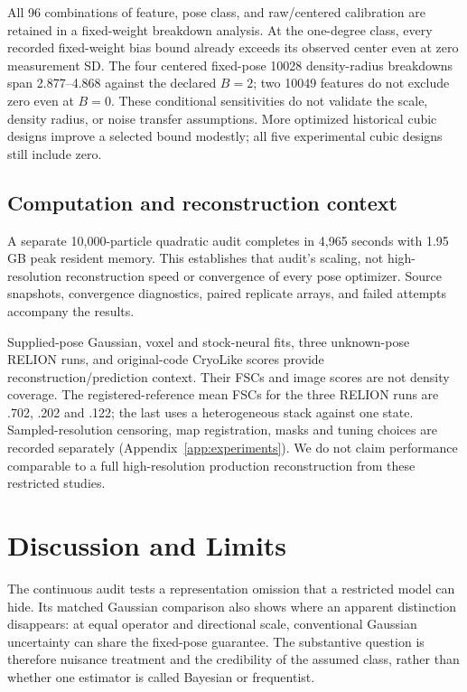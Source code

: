 \documentclass{article}
\begin{document}
All 96 combinations of feature, pose class, and raw/centered calibration are retained in a fixed-weight breakdown analysis. At the one-degree class, every recorded fixed-weight bias bound already exceeds its observed center even at zero measurement SD. The four centered fixed-pose 10028 density-radius breakdowns span 2.877--4.868 against the declared $B=2$; two 10049 features do not exclude zero even at $B=0$. These conditional sensitivities do not validate the scale, density radius, or noise transfer assumptions. More optimized historical cubic designs improve a selected bound modestly; all five experimental cubic designs still include zero.

\subsection{Computation and reconstruction context}
A separate 10,000-particle quadratic audit completes in 4,965 seconds with 1.95 GB peak resident memory. This establishes that audit's scaling, not high-resolution reconstruction speed or convergence of every pose optimizer. Source snapshots, convergence diagnostics, paired replicate arrays, and failed attempts accompany the results.

Supplied-pose Gaussian, voxel and stock-neural fits, three unknown-pose RELION runs, and original-code CryoLike scores provide reconstruction/prediction context. Their FSCs and image scores are not density coverage. The registered-reference mean FSCs for the three RELION runs are .702, .202 and .122; the last uses a heterogeneous stack against one state. Sampled-resolution censoring, map registration, masks and tuning choices are recorded separately (Appendix~\ref{app:experiments}). We do not claim performance comparable to a full high-resolution production reconstruction from these restricted studies.

\section{Discussion and Limits}
The continuous audit tests a representation omission that a restricted model can hide. Its matched Gaussian comparison also shows where an apparent distinction disappears: at equal operator and directional scale, conventional Gaussian uncertainty can share the fixed-pose guarantee. The substantive question is therefore nuisance treatment and the credibility of the assumed class, rather than whether one estimator is called Bayesian or frequentist.
\end{document}
